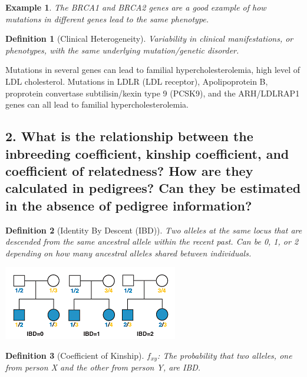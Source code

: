 \documentclass{tufte-handout}
\theoremstyle{noparens}
\newtheorem*{define}{Definition}
\newtheorem*{example}{Example}
\begin{document}
\begin{example}
The BRCA1 and BRCA2 genes are a good example of how mutations in different genes lead to the same phenotype. 
\end{example}

\begin{define}[Clinical Heterogeneity]
Variability in clinical manifestations, or phenotypes, with the same underlying mutation/genetic disorder.
\end{define}

Mutations in several genes can lead to familial hypercholesterolemia, high level of LDL cholesterol. Mutations in LDLR (LDL receptor), Apolipoprotein B, proprotein convertase subtilisin/kexin type 9 (PCSK9), and the ARH/LDLRAP1 genes can all lead to familial hypercholesterolemia.

\newpage
\subsection{2. What is the relationship between the inbreeding coefficient, kinship coefficient, and coefficient of relatedness? How are they calculated in pedigrees? Can they be estimated in the absence of pedigree information?}
\label{subsec:02} 

\begin{define}[Identity By Descent (IBD)]
Two alleles at the same locus that are descended from the same ancestral allele within the recent past. Can be 0, 1, or 2 depending on how many ancestral alleles shared between individuals.
\end{define}

\begin{marginfigure}%
  \includegraphics[scale=0.65]{./figs/ibd}
  \caption{IBD Pedigree Example}
  \label{fig:marginfig}
\end{marginfigure}

\begin{define}[Coefficient of Kinship]
$f_{xy}$: The probability that two alleles, one from person X and the other from person Y, are IBD.
\end{define}
\end{document}
